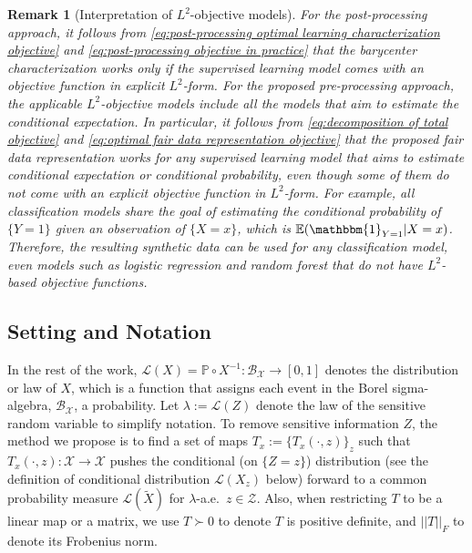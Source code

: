\documentclass[twoside,11pt]{article}
\newtheorem{rema}{Remark}[section]{\bfseries}{\itshape}
\begin{document}
\begin{rema}[Interpretation of $L^2$-objective models]\label{r:Interpretation of L2-objective Models}
For the post-processing approach, it follows from \eqref{eq:post-processing optimal learning characterization objective} and \eqref{eq:post-processing objective in practice} that the barycenter characterization works only if the supervised learning model comes with an objective function in explicit $L^2$-form.
For the proposed pre-processing approach, the applicable $L^2$-objective models include all the models that aim to estimate the conditional expectation. In particular, it follows from \eqref{eq:decomposition of total objective} and \eqref{eq:optimal fair data representation objective} that the proposed fair data representation works for any supervised learning model that aims to estimate conditional expectation or conditional probability, even though some of them do not come with an explicit objective function in $L^2$-form. For example, all classification models share the goal of estimating the conditional probability of $\{Y = 1\}$ given an observation of $\{X = x\}$, which is $\mathbb{E}(\mathbbm{1}_{Y = 1} | X = x)$. Therefore, the resulting synthetic data can be used for any classification model, even models such as logistic regression and random forest that do not have $L^2$-based objective functions.
\end{rema} 

\subsection{Setting and Notation}

In the rest of the work, $\mathcal{L}(X) = \mathbb{P} \circ X^{-1}: \mathcal{B}_{\mathcal{X}} \rightarrow [0,1]$ denotes the distribution or law of $X$, which is a function that assigns each event in the Borel sigma-algebra, $\mathcal{B}_{\mathcal{X}}$, a probability.  Let $\lambda := \mathcal{L}(Z)$ denote the law of the sensitive random variable to simplify notation. To remove sensitive information $Z$, the method we propose is to find a set of maps $T_x := \{T_x(\cdot,z)\}_z$ such that $T_x(\cdot,z): \mathcal{X} \rightarrow \mathcal{X}$ pushes the conditional (on $\{Z = z\}$) distribution (see the definition of conditional distribution $\mathcal{L}(X_z)$ below) forward to a common probability measure $\mathcal{L}(\tilde{X})$ for $\lambda$-a.e.\ $z \in \mathcal{Z}$. Also, when restricting $T$ to be a linear map or a matrix, we use $T \succ 0$ to denote $T$ is positive definite, and $||T||_F$ to denote its Frobenius norm.
\end{document}

